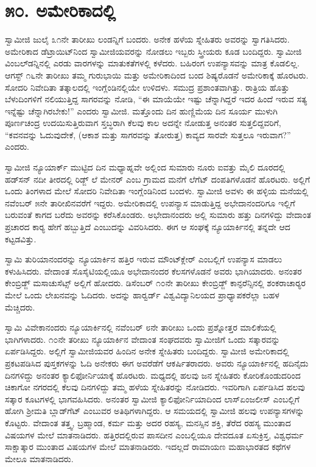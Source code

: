 
\chapter*{೫೦. ಅಮೇರಿಕಾದಲ್ಲಿ}

 ಸ್ವಾಮೀಜಿ ಜುಲೈ ೩೧ನೇ ತಾರೀಖು ಲಂಡನ್ನಿಗೆ ಬಂದರು. ಅನೇಕ ಹಳೆಯ ಸ್ನೇಹಿತರು ಅವರನ್ನು ಸ್ವಾಗತಿಸಿದರು. ಅಮೇರಿಕಾದ ಡೆಟ್ರಾಯಿಟ್‍ನಿಂದ ಸ್ವಾಮೀಜಿಯವರನ್ನು ನೋಡಲು ಇಬ್ಬರು ಸ್ತ್ರೀಯರು ಕೂಡ ಬಂದಿದ್ದರು. ಸ್ವಾಮೀಜಿ ವಿಂಬಲ್‍ಡನ್ನಿನಲ್ಲಿ ಎರಡು ವಾರಗಳನ್ನು ಮಾತುಕತೆಗಳಲ್ಲಿ ಕಳೆದರು. ಬಹಿರಂಗ ಉಪನ್ಯಾಸವನ್ನು ಮಾತ್ರ ಕೊಡಲಿಲ್ಲ. ಆಗಸ್ಟ್ ೧೬ನೇ ತಾರೀಖು ತಮ್ಮ ಗುರುಭಾಯಿ ಮತ್ತು ಅಮೇರಿಕಾದಿಂದ ಬಂದ ಶಿಷ್ಯರೊಡನೆ ಅಮೇರಿಕಾಕ್ಕೆ ಹೊರಟರು. ಸೋದರಿ ನಿವೇದಿತಾ ತತ್ಕಾಲದಲ್ಲಿ ಇಂಗ್ಲೆಂಡಿನಲ್ಲಿಯೇ ಉಳಿದಳು. ಸಮುದ್ರ ಪ್ರಶಾಂತವಾಗಿತ್ತು. ರಾತ್ರಿಯ ಹೊತ್ತು ಬೆಳುದಿಂಗಳಿಗೆ ನಲಿಯುತ್ತಿದ್ದ ಸಾಗರವನ್ನು ನೋಡಿ, “ಈ ಮಾಯೆಯೇ ಇಷ್ಟು ಚೆನ್ನಾಗಿದ್ದರೆ ಇದರ ಹಿಂದೆ ಇರುವ ಸತ್ಯ ಇನ್ನೆಷ್ಟು ಚೆನ್ನಾಗಿರಬೇಕು!” ಎಂದರು ಸ್ವಾಮೀಜಿ. ಮತ್ತೊಂದು ದಿನ ಹುಣ್ಣಿಮೆಯ ದಿನ ಸೂರ್ಯ ಮುಳುಗಿ ಪೂರ್ಣಚಂದ್ರ ಉದಯಿಸುತ್ತಿರುವಾಗ ಸ್ತಬ್ಧರಾಗಿ ಕೆಲವು ಕಾಲ ಅದನ್ನೇ ನೋಡುತ್ತ ಅನಂತರ ಸುತ್ತಲಿದ್ದವರಿಗೆ, “ಕವನವನ್ನು ಓದುವುದೇಕೆ, (ಆಕಾಶ ಮತ್ತು ಸಾಗರವನ್ನು ತೋರುತ್ತ) ಕಾವ್ಯದ ಸಾರವೇ ಸುತ್ತಲೂ ಇರುವಾಗ?” ಎಂದರು. 

 ಸ್ವಾಮೀಜಿ ನ್ಯೂಯಾರ್ಕ್ ಮುಟ್ಟಿದ ದಿನ ಮಧ್ಯಾಹ್ನವೇ ಅಲ್ಲಿಂದ ಸುಮಾರು ನೂರು ಐವತ್ತು ಮೈಲಿ ದೂರದಲ್ಲಿ ಹಡ್‍ಸನ್ ನದೀ ತೀರದಲ್ಲಿ ರಿಡ್ಜ್ ಲೆ ಮೇನರ್ ಎಂಬ ಗ್ರಾಮದ ಮನೆಗೆ ಲೆಗೆಟ್ ದಂಪತಿಗಳೊಡನೆ ಹೊರಟರು. ಅಲ್ಲಿಗೆ ಒಂದು ತಿಂಗಳಾದ ಮೇಲೆ ಸೋದರಿ ನಿವೇದಿತಾ ಇಂಗ್ಲೆಂಡಿನಿಂದ ಬಂದಳು. ಸ್ವಾಮೀಜಿ ಅವಳು ಈ ಹಳ್ಳಿಯ ಮನೆಯಲ್ಲಿ ನವೆಂಬರ್ ೫ನೇ ತಾರೀಖಿನವರೆಗೆ ಇದ್ದರು. ಅಮೇರಿಕಾದಲ್ಲಿ ಉಪನ್ಯಾಸ ಮಾಡುತ್ತಿದ್ದ ಅಭೇದಾನಂದರಿಗೂ ಇಲ್ಲಿಗೆ ಬರುವಂತೆ ಕಾಗದ ಬರೆದು ಅವರನ್ನು ಕರೆಸಿಕೊಂಡರು. ಅಭೇದಾನಂದರು ಅಲ್ಲಿ ಸುಮಾರು ಹತ್ತು ದಿನಗಳಿದ್ದು ವೇದಾಂತ ಪ್ರಚಾರದ ಕಾರ‍್ಯ ಹೇಗೆ ಹಬ್ಬುತ್ತಿದೆ ಎಂಬುದನ್ನು ವಿವರಿಸಿದರು. ಈಗ ಆ ಸಂಘಕ್ಕೆ ನ್ಯೂಯಾರ್ಕಿನಲ್ಲಿ ತನ್ನದೇ ಆದ ಕಟ್ಟಡವಿತ್ತು. 

 ಸ್ವಾಮಿ ತುರಿಯಾನಂದರನ್ನು ನ್ಯೂಯಾರ್ಕಿನ ಹತ್ತಿರ ಇರುವ ಮೌಂಟ್‍ಕ್ಲೇರ್ ಎಂಬಲ್ಲಿಗೆ ಉಪನ್ಯಾಸ ಮಾಡಲು ಕಳುಹಿಸಿದರು. ವೇದಾಂತ ಸೊಸೈಟಿಯಲ್ಲಿಯೂ ಅಭೇದಾನಂದರ ಕೆಲಸಗಳೊಡನೆ ಅವರು ಭಾಗಿಯಾದರು. ಅನಂತರ ಕೇಂಬ್ರಿಡ್ಜ್ ಮಸಾಚುಸೆಟ್ಸ್ ಅಲ್ಲಿಗೆ ಹೋದರು. ಡಿಸೆಂಬರ್ ೧೦ನೇ ತಾರೀಖು ಕೇಂಬ್ರಿಡ್ಜ್ ಕಾನ್ಫರೆನ್ಸಿನಲ್ಲಿ ಶಂಕರಾಚಾರ‍್ಯರ ಮೇಲೆ ಒಂದು ಲೇಖನವನ್ನು ಓದಿದರು. ಅದನ್ನು ಹಾರ್‍ವರ್ಡ್ ವಿಶ್ವವಿದ್ಯಾನಿಲಯದ ಪ್ರಾಧ್ಯಾಪಕರೆಲ್ಲಾ ಬಹಳ ಮೆಚ್ಚಿದರು. 

 ಸ್ವಾಮಿ ವಿವೇಕಾನಂದರು ನ್ಯೂಯಾರ್ಕಿನಲ್ಲಿ ನವೆಂಬರ್ ೮ನೇ ತಾರೀಖು ಒಂದು ಪ್ರಶ್ನೋತ್ತರ ಮಾಲಿಕೆಯಲ್ಲಿ ಭಾಗಿಗಳಾದರು. ೧೦ನೇ ತರೀಖು ನ್ಯೂಯಾರ್ಕಿನ ವೇದಾಂತ ಸಂಘದವರು ಸ್ವಾಮೀಜಿಗೆ ಒಂದು ಸತ್ಕಾರವನ್ನು ಏರ್ಪಡಿಸಿದ್ದರು. ಅಲ್ಲಿಗೆ ಸ್ವಾಮೀಜಿಯವರ ಹಿಂದಿನ ಅನೇಕ ಸ್ನೇಹಿತರು ಬಂದಿದ್ದರು. ಸ್ವಾಮೀಜಿ ಅಮೇರಿಕಾದಲ್ಲಿ ಪ್ರಕಟಪಡಿಸಿದ ಪುಸ್ತಕಗಳನ್ನು ಓದಿ ಅನೇಕರು ಈಗ ಅವರೆಡೆಗೆ ಆಕರ್ಷಿತರಾದರು. ಅವರು ನ್ಯೂಯಾರ್ಕಿನಲ್ಲಿ ಹದಿನೈದು ದಿನಗಳಿದ್ದು ಅನಂತರ ಕ್ಯಾಲಿಫೋರ್ನಿಯಾಕ್ಕೆ ಹೊರಟರು. ಮಧ್ಯದಲ್ಲಿ ಹಲವು ಜನ ಸ್ನೇಹಿತರು ಕೋರಿಕೊಂಡುದರಿಂದ ಚಿಕಾಗೋ ನಗರದಲ್ಲಿ ಕೆಲವು ದಿನಗಳಿದ್ದು ತಮ್ಮ ಹಳೆಯ ಸ್ನೇಹಿತರನ್ನು ನೋಡಿದರು. ಇವರಿಗಾಗಿ ಏರ್ಪಡಿಸಿದ ಹಲವು ಸತ್ಕಾರ ಕೂಟಗಳಲ್ಲಿ ಭಾಗವಹಿಸಿದರು. ಅನಂತರ ಸ್ವಾಮೀಜಿ ಕ್ಯಾಲಿಫೋರ್ನಿಯಾದಿಂದ ಲಾಸ್‍ಏಂಜಲೀಸ್ ಎಂಬಲ್ಲಿಗೆ ಹೋಗಿ ಶ‍್ರೀಮತಿ ಬ್ಲಾಡ್‍ಗೆಟ್ ಎಂಬುವರ ಅತಿಥಿಗಳಾಗಿದ್ದರು. ಆ ಸಮಯದಲ್ಲಿ ಸ್ವಾಮೀಜಿ ಹಲವು ಉಪನ್ಯಾಸಗಳನ್ನು ಕೊಟ್ಟರು. ವೇದಾಂತ ತತ್ತ್ವ, ಬ್ರಹ್ಮಾಂಡ, ಕರ್ಮ ಮತ್ತು ಅದರ ರಹಸ್ಯ, ಮನಸ್ಸಿನ ಶಕ್ತಿ, ತೆರೆದ ರಹಸ್ಯ ಮುಂತಾದ ವಿಷಯಗಳ ಮೇಲೆ ಮಾತನಾಡಿದರು. ಹತ್ತಿರದಲ್ಲಿರುವ ಪಾಸದೀನ ಎಂಬಲ್ಲಿಯೂ ದೇವದೂತ ಏಸುಕ್ರಿಸ್ತ, ವಿಶ್ವಧರ್ಮ ಸಾಕ್ಷಾತ್ಕಾರ ಮುಂತಾದ ವಿಷಯಗಳ ಮೇಲೆ ಮಾತನಾಡಿದರು. ಇದಲ್ಲದೆ ರಾಮಾಯಣ ಮಹಾಭಾರತದ ಕಥೆಗಳ ಮೇಲೂ ಮಾತನಾಡಿದರು. 

